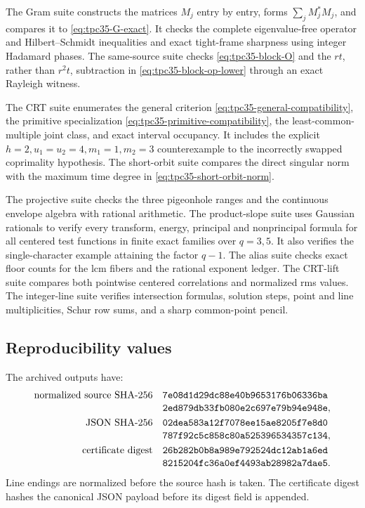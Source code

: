 The Gram suite constructs the matrices \(M_j\) entry by entry, forms
\(\sum_jM_j^*M_j\), and compares it to
\eqref{eq:tpc35-G-exact}.  It checks the complete eigenvalue-free
operator and Hilbert--Schmidt inequalities and exact tight-frame
sharpness using integer Hadamard phases.  The same-source suite checks
\eqref{eq:tpc35-block-O} and the \(rt\), rather than \(r^2t\), subtraction
in \eqref{eq:tpc35-block-op-lower} through an exact Rayleigh witness.

The CRT suite enumerates the general criterion
\eqref{eq:tpc35-general-compatibility}, the primitive specialization
\eqref{eq:tpc35-primitive-compatibility}, the least-common-multiple joint
class, and exact interval occupancy.  It includes the explicit
\(h=2,u_1=u_2=4,m_1=1,m_2=3\) counterexample to the incorrectly swapped
coprimality hypothesis.  The short-orbit suite compares the direct
singular norm with the maximum time degree in
\eqref{eq:tpc35-short-orbit-norm}.

The projective suite checks the three pigeonhole ranges and the continuous
envelope algebra with rational arithmetic.  The product-slope suite uses
Gaussian rationals to verify every transform, energy, principal and
nonprincipal formula for all centered test functions in finite exact
families over \(q=3,5\).  It also verifies the single-character example
attaining the factor \(q-1\).  The alias suite checks exact floor counts
for the lcm fibers and the rational exponent ledger.  The CRT-lift suite
compares both pointwise centered correlations and normalized rms values.
The integer-line suite verifies intersection formulas, solution steps,
point and line multiplicities, Schur row sums, and a sharp common-point
pencil.

\subsection{Reproducibility values}

The archived outputs have:
\begin{align}
 \text{normalized source SHA-256}\quad
 &\texttt{7e08d1d29dc88e40b9653176b06336ba}
 \notag\\[-0.2em]
 &\texttt{2ed879db33fb080e2c697e79b94e948e},
 \label{eq:tpc35-source-hash}\\
 \text{JSON SHA-256}\quad
 &\texttt{02dea583a12f7078ee15ae8205f7e8d0}
 \notag\\[-0.2em]
 &\texttt{787f92c5c858c80a525396534357c134},
 \label{eq:tpc35-json-hash}\\
 \text{certificate digest}\quad
 &\texttt{26b282b0b8a989e792524dc12ab1a6ed}
 \notag\\[-0.2em]
 &\texttt{8215204fc36a0ef4493ab28982a7dae5}.
 \label{eq:tpc35-certificate-digest}
\end{align}
Line endings are normalized before the source hash is taken.  The
certificate digest hashes the canonical JSON payload before its digest
field is appended.

